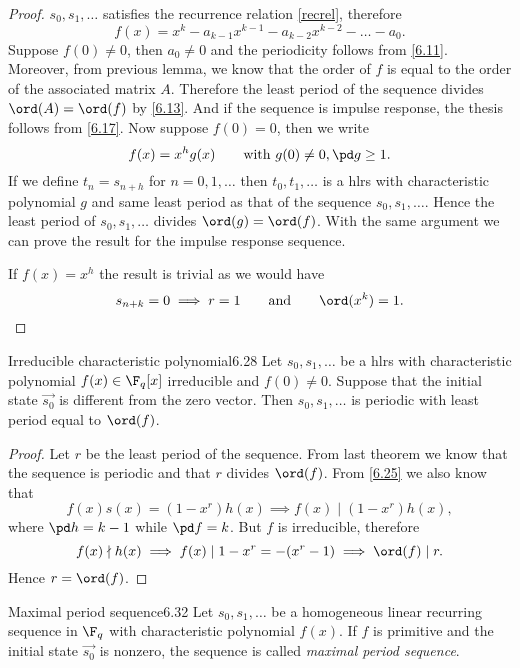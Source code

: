 \begin{proof}
	\(s_0,s_1,\ldots\) satisfies the recurrence relation \eqref{recrel}, therefore
	\[
		f(x) = x^k-a_{k-1}x^{k-1}-a_{k-2}x^{k-2}-\ldots-a_0.
	\]
	Suppose \(f(0)\neq 0\), then \(a_0\neq 0\) and the periodicity follows from \autoref{6.11}.
	Moreover, from previous lemma, we know that the order of \(f\) is equal to the order of the associated matrix \(A\). Therefore the least period of the sequence divides \(\ord(A)=\ord(f)\) by \autoref{6.13}. And if the sequence is impulse response, the thesis follows from \autoref{6.17}.
	Now suppose \(f(0)=0\), then we write
	\[
		f(x) = x^h g(x) \qquad\text{with }g(0)\neq 0, \pd g\ge 1.
	\]
	If we define \(t_n=s_{n+h}\) for \(n=0,1,\ldots\) then \(t_0,t_1,\ldots\) is a hlrs with characteristic polynomial \(g\) and same least period as that of the sequence \(s_0,s_1,\ldots\). Hence the least period of \(s_0,s_1,\ldots\) divides \(\ord(g)=\ord(f)\). With the same argument we can prove the result for the impulse response sequence.
	
	If \(f(x)=x^h\) the result is trivial as we would have
	\[
		s_{n+k}=0 \implies r=1 \qquad\text{and}\qquad\ord(x^k)=1.\qedhere
	\]
\end{proof}

\begin{teor}{Irreducible characteristic polynomial}{6.28}
	Let \(s_0,s_1,\ldots\) be a hlrs with characteristic polynomial \(f(x)\in\F_q[x]\) irreducible and \(f(0)\neq 0\). Suppose that the initial state \(\vec{s_0}\) is different from the zero vector. Then \(s_0,s_1,\ldots\) is periodic with least period equal to \(\ord(f)\).
\end{teor}

\begin{proof}
	Let \(r\) be the least period of the sequence.
	From last theorem we know that the sequence is periodic and that \(r\) divides \(\ord(f)\). From \autoref{6.25} we also know that
	\[
		f(x)s(x) = (1-x^r)h(x) \implies f(x) \mid (1-x^r)h(x),
	\]
	where \(\pd h=k-1\) while \(\pd f = k\). But \(f\) is irreducible, therefore
	\[
		f(x) \nmid h(x) \implies f(x) \mid 1-x^r = -(x^r-1) \implies \ord(f) \mid r.
	\]
	Hence \(r=\ord(f)\).
\end{proof}

\begin{defn}{Maximal period sequence}{6.32}
	Let \(s_0,s_1,\ldots\) be a homogeneous linear recurring sequence in \(\F_q\) with characteristic polynomial \(f(x)\). If \(f\) is primitive and the initial state \(\vec{s_0}\) is nonzero, the sequence is called \emph{maximal period sequence}.
\end{defn}

